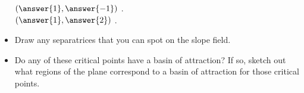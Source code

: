 \documentclass{ximera}
\begin{document}
\begin{exercise}
\begin{itemize}
            $\left(\answer{1}, \answer{-1}\right)$  . \\
            $\left(\answer{1}, \answer{2}\right)$  . \\
        \item Draw any separatrices that you can spot on the slope field.
        \item Do any of these critical points have a basin of attraction? If so, sketch out what regions of the plane correspond to a basin of attraction for those critical points. 
    \end{itemize}
\end{exercise}
% 
\end{document}

